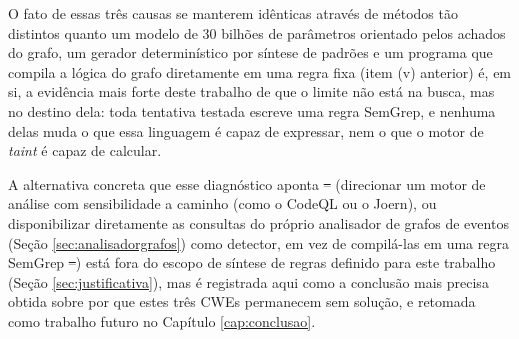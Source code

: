 \documentclass[
    12pt,                %
    openright,           %
    oneside,             %
    a4paper,             %
    english,             %
    brazil               %
]{abntex2}
\newcommand{\antigo}[1]{\sout{#1}}
\newcommand{\novo}[1]{{\color{red}#1}}
\begin{document}
\par
O fato de essas três causas se manterem idênticas através de métodos tão distintos quanto um modelo de 30 bilhões de parâmetros orientado pelos achados do grafo, um gerador determinístico por síntese de padrões e um programa que compila a lógica do grafo diretamente em uma regra fixa (item (v) anterior) é, em si, a evidência mais forte deste trabalho de que o limite não está na busca, mas no destino dela: toda tentativa testada escreve uma regra SemGrep, e nenhuma delas muda o que essa linguagem é capaz de expressar\novo{, nem o que o motor de \textit{taint} é capaz de calcular}.
\par
A alternativa concreta que esse diagnóstico aponta\antigo{ --}\novo{ (}direcionar um motor de análise com sensibilidade a caminho (como o CodeQL ou o Joern), ou disponibilizar diretamente as consultas do próprio analisador de grafos de eventos (Seção \ref{sec:analisadorgrafos}) como detector, em vez de compilá-las em uma regra SemGrep\antigo{ --}\novo{)} está fora do escopo de síntese de regras definido para este trabalho (Seção \ref{sec:justificativa}), mas é registrada aqui como a conclusão mais precisa obtida sobre por que estes três CWEs permanecem sem solução, e retomada como trabalho futuro no Capítulo \ref{cap:conclusao}.
\end{document}
